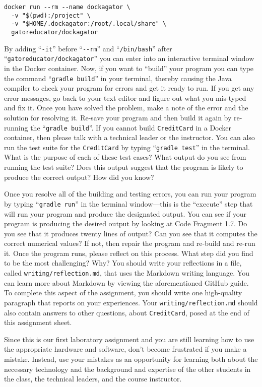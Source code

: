 \documentclass[11pt]{article}
\newcommand{\mainprogram}{\lstinline{CreditCard}}
\newcommand{\reflection}{\lstinline{writing/reflection.md}}
\newcommand{\gradlebuild}{\command{gradle build}}
\newcommand{\gradletest}{\command{gradle test}}
\newcommand{\gradlerun}{\command{gradle run}}
\newcommand{\command}[1]{``\lstinline{#1}''}
\newcommand{\step}[1]{``{#1}''}
\begin{document}
\vspace*{-.1in}
\begin{verbatim}
docker run --rm --name dockagator \
  -v "$(pwd):/project" \
  -v "$HOME/.dockagator:/root/.local/share" \
  gatoreducator/dockagator
\end{verbatim}
\vspace*{-.05in}

By adding \command{-it} before \command{--rm} and \command{/bin/bash} after
\command{gatoreducator/dockagator} you can enter into an interactive terminal
window in the Docker container. Now, if you want to \step{build} your program
you can type the command \gradlebuild{} in your terminal, thereby causing the
Java compiler to check your program for errors and get it ready to run. If you
get any error messages, go back to your text editor and figure out what you
mis-typed and fix it. Once you have solved the problem, make a note of the error
and the solution for resolving it. Re-save your program and then build it again
by re-running the \gradlebuild{}. If you cannot build \mainprogram{} in a Docker
container, then please talk with a technical leader or the instructor. You can
also run the test suite for the \mainprogram{} by typing \gradletest{} in the
terminal. What is the purpose of each of these test cases? What output do you
see from running the test suite? Does this output suggest that the program is
likely to produce the correct output? How did you know?

Once you resolve all of the building and testing errors, you can run your
program by typing \gradlerun{} in the terminal window---this is the ``execute''
step that will run your program and produce the designated output. You can see
if your program is producing the desired output by looking at Code Fragment 1.7.
Do you see that it produces twenty lines of output? Can you see that it computes
the correct numerical values? If not, then repair the program and re-build and
re-run it. Once the program runs, please reflect on this process. What step did
you find to be the most challenging? Why? You should write your reflections in a
file, called \reflection{}, that uses the Markdown writing language. You can
learn more about Markdown by viewing the aforementioned GitHub guide. To
complete this aspect of the assignment, you should write one high-quality
paragraph that reports on your experiences. Your \reflection{} should also
contain answers to other questions, about \mainprogram{}, posed at the end of
this assignment sheet.

Since this is our first laboratory assignment and you are still learning how to
use the appropriate hardware and software, don't become frustrated if you make a
mistake. Instead, use your mistakes as an opportunity for learning both about
the necessary technology and the background and expertise of the other students
in the class, the technical leaders, and the course instructor.
\end{document}
